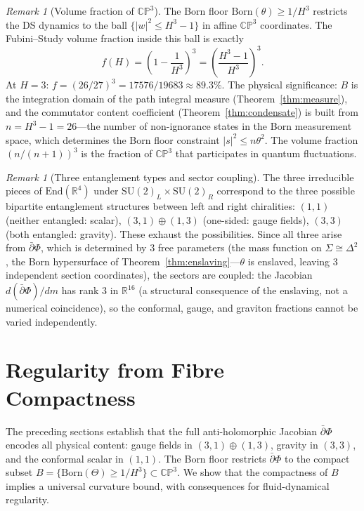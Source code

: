 \documentclass[11pt,a4paper]{article}
\theoremstyle{definition}
\theoremstyle{remark}
\newtheorem{remark}[theorem]{Remark}
\newcommand{\CP}{\mathbb{CP}}
\newcommand{\R}{\mathbb{R}}
\newcommand{\dbar}{\bar{\partial}}
\newcommand{\SU}{\mathrm{SU}}
\begin{document}
\begin{remark}[Volume fraction of $\CP^3$]
The Born floor $\mathrm{Born}(\theta)\geq 1/H^3$ restricts the DS dynamics to the ball $\{|w|^2\leq H^3-1\}$ in affine $\CP^3$ coordinates. The Fubini--Study volume fraction inside this ball is exactly
\begin{equation}\label{eq:volume_fraction}
f(H)=\left(1-\frac{1}{H^3}\right)^3=\left(\frac{H^3-1}{H^3}\right)^3.
\end{equation}
At $H=3$: $f=(26/27)^3=17576/19683\approx 89.3\%$. The physical significance: $B$ is the integration domain of the path integral measure (Theorem~\ref{thm:measure}), and the commutator content coefficient (Theorem~\ref{thm:condensate}) is built from $n=H^3-1=26$---the number of non-ignorance states in the Born measurement space, which determines the Born floor constraint $|s|^2\leq n\theta^2$. The volume fraction $(n/(n+1))^3$ is the fraction of $\CP^3$ that participates in quantum fluctuations.
\end{remark}

\begin{remark}[Three entanglement types and sector coupling]\label{rem:entanglement_types}
The three irreducible pieces of $\mathrm{End}(\R^4)$ under $\SU(2)_L\times\SU(2)_R$ correspond to the three possible bipartite entanglement structures between left and right chiralities: $(1,1)$ (neither entangled: scalar), $(3,1)\oplus(1,3)$ (one-sided: gauge fields), $(3,3)$ (both entangled: gravity). These exhaust the possibilities. Since all three arise from $\dbar\Phi$, which is determined by $3$ free parameters (the mass function on $\Sigma\cong\Delta^2$, the Born hypersurface of Theorem~\ref{thm:enslaving}---$\theta$ is enslaved, leaving $3$ independent section coordinates), the sectors are coupled: the Jacobian $d(\dbar\Phi)/dm$ has rank $3$ in $\R^{16}$ (a structural consequence of the enslaving, not a numerical coincidence), so the conformal, gauge, and graviton fractions cannot be varied independently.
\end{remark}


\section{Regularity from Fibre Compactness}\label{sec:regularity}

The preceding sections establish that the full anti-holomorphic Jacobian $\dbar\Phi$ encodes all physical content: gauge fields in $(3,1)\oplus(1,3)$, gravity in $(3,3)$, and the conformal scalar in $(1,1)$. The Born floor restricts $\dbar\Phi$ to the compact subset $B=\{\mathrm{Born}(\Theta)\geq 1/H^3\}\subset\CP^3$. We show that the compactness of $B$ implies a universal curvature bound, with consequences for fluid-dynamical regularity.
\end{document}
